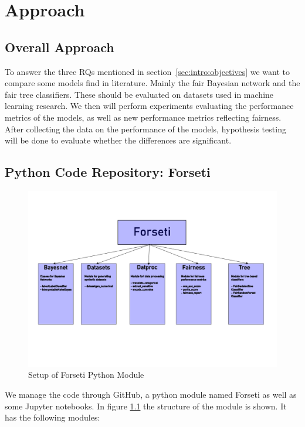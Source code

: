 \chapter{Approach}
\label{ch:approach}

\section{Overall Approach}
To answer the three RQs mentioned in section~\ref{sec:intro:objectives} we want to compare some models find in literature. Mainly the fair Bayesian network and the fair tree classifiers. These should be evaluated on datasets used in machine learning research. We then will perform experiments evaluating the performance metrics of the models, as well as new performance metrics reflecting fairness. After collecting the data on the performance of the models, hypothesis testing will be done to evaluate whether the differences are significant.

\section{Python Code Repository: Forseti}

\begin{figure}
    \centering
    \includegraphics[width=\linewidth]{figures/tegning.png}
    \caption{Setup of Forseti Python Module}
    \label{fig:forseti}
\end{figure}

We manage the code through GitHub, a python module named Forseti as well as some Jupyter notebooks. In figure \ref{fig:forseti} the structure of the module is shown. It has the following modules:


